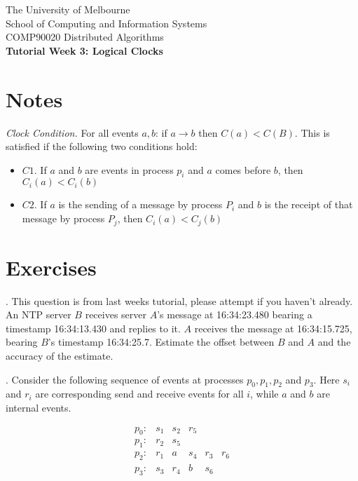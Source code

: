 \documentclass[12pt]{article}
\newcounter{question}
\newcommand{\question}[1]{
    \stepcounter{question}
    \thequestion. #1 \hfill
}
\begin{document}
\begin{center}
    {\sc The University of Melbourne
        \\
        School of Computing and Information Systems
        \\
    COMP90020 Distributed Algorithms}
    \bigskip \\
    {\Large\bf Tutorial Week 3: Logical Clocks}
    \bigskip \\
\end{center}
\section*{Notes}
\textit{Clock Condition.} For all events $a,b$: if $a \rightarrow b$ then $C(a) < C(B)$. This is satisfied if the following two conditions hold:
\begin{itemize}
    \item $C1$. If $a$ and $b$ are events in process $p_i$ and $a$ comes before $b$, then $C_i(a) < C_i(b)$
    \item $C2$. If $a$ is the sending of a message by process $P_i$ and $b$ is the receipt of that message by process $P_j$, then $C_i(a) < C_j(b)$
\end{itemize}

\section*{Exercises}


\setcounter{question}{9}

\question{This question is from last weeks tutorial, please attempt if you haven't already. An NTP server $B$ receives server $A$’s message at 16:34:23.480 bearing a timestamp 16:34:13.430 and replies to it. $A$ receives the message at 16:34:15.725, bearing $B$’s timestamp 16:34:25.7. Estimate the offset between $B$ and $A$ and the accuracy of the estimate.}

\question{Consider the following sequence of events at processes $p_0, p_1, p_2$ and $p_3$. Here $s_i$ and $r_i$ are corresponding send and receive events for all $i$, while $a$ and $b$ are internal events.}
\[
    \begin{array}{llllll}
        p_0: & s_1 & s_2 & r_5  \\
        p_1: & r_2 & s_5 \\
        p_2: & r_1 & a & s_4 & r_3 & r_6 \\
        p_3: & s_3 & r_4 & b & s_6
    \end{array}
\]
\end{document}
